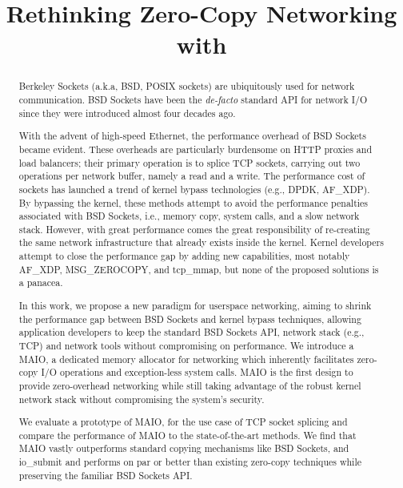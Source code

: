 \documentclass[sigconf,9pt]{acmart}
\title{Rethinking Zero-Copy Networking with \oursys}
\newcommand{\oursys}{MAIO\xspace}
\newcommand{\sockets}{BSD Sockets\xspace}
\begin{document}
\begin{abstract}
    Berkeley Sockets (a.k.a, BSD, POSIX sockets) are ubiquitously used for network communication. \sockets have been the \emph{de-facto} standard API for network I/O since they were introduced almost four decades ago. 
    
    With the advent of high-speed Ethernet, the performance overhead of \sockets became evident. These overheads are particularly burdensome on HTTP proxies and load balancers; their primary operation is to splice TCP sockets, carrying out two operations per network buffer, namely a read and a write. The performance cost of sockets has launched a trend of kernel bypass technologies (e.g., DPDK, AF\_XDP). By bypassing the kernel, these methods attempt to avoid the performance penalties associated with \sockets, i.e., memory copy, system calls, and a slow network stack. However, with great performance comes the great responsibility of re-creating the same network infrastructure that already exists inside the kernel. Kernel developers attempt to close the performance gap by adding new capabilities, most notably AF\_XDP, MSG\_ZEROCOPY, and tcp\_mmap, but none of the proposed solutions is a panacea.
    
    In this work, we propose a new paradigm for userspace networking, aiming to shrink the performance gap between \sockets and kernel bypass techniques, allowing application developers to keep the standard \sockets API, network stack (e.g., TCP) and network tools without compromising on performance. We introduce a \oursys, a dedicated memory allocator for networking which inherently facilitates zero-copy I/O operations and exception-less system calls. \oursys is the first design to provide zero-overhead networking while still taking advantage of the robust kernel network stack without compromising the system's security.
    
    We evaluate a prototype of \oursys, for the use case of TCP socket splicing and compare the performance of \oursys to the state-of-the-art methods. We find that \oursys vastly outperforms standard copying mechanisms like \sockets, and io\_submit and performs on par or better than existing zero-copy techniques while preserving the familiar \sockets API. 
    
\end{abstract}
\end{document}
